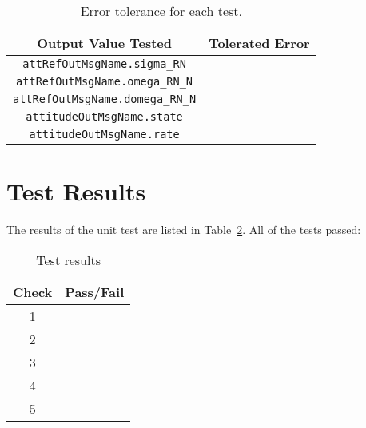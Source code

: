 \begin{table}[htbp]
	\caption{Error tolerance for each test.}
	\label{tab:errortol}
	\centering \fontsize{10}{10}\selectfont
	\begin{tabular}{ c | c } %
		\hline\hline
		\textbf{Output Value Tested}  & \textbf{Tolerated Error}  \\ 
		\hline
		{\tt attRefOutMsgName.sigma\_RN}        & 	   \\ 
		{\tt attRefOutMsgName.omega\_RN\_N}        & 	   \\ 
		{\tt attRefOutMsgName.domega\_RN\_N}        & 	   \\ 
		{\tt attitudeOutMsgName.state}        & 	   \\ 
		{\tt attitudeOutMsgName.rate}        & 	   \\ 
		\hline\hline
	\end{tabular}
\end{table}




\section{Test Results}
The results of the unit test are listed in Table~\ref{tab:results}.  
All of the tests passed:
\begin{table}[H]
	\caption{Test results}
	\label{tab:results}
	\centering \fontsize{10}{10}\selectfont
	\begin{tabular}{c | c  } %
		\hline\hline
		\textbf{Check} 						  		&\textbf{Pass/Fail} \\ 
		\hline
	   1	   			&  \\ 
	   2	   			&  \\ 
	   3	   			&  \\ 
	   4	   			&  \\ 
	   5	   			&  \\ 
	   \hline\hline
	\end{tabular}
\end{table}



